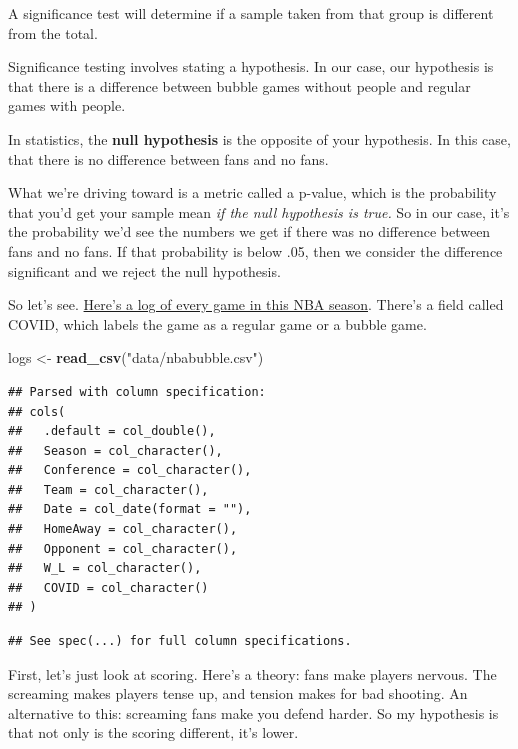 \documentclass[
]{book}
\newenvironment{Shaded}{\begin{snugshade}}{\end{snugshade}}
\newcommand{\KeywordTok}[1]{\textcolor[rgb]{0.13,0.29,0.53}{\textbf{#1}}}
\newcommand{\NormalTok}[1]{#1}
\newcommand{\StringTok}[1]{\textcolor[rgb]{0.31,0.60,0.02}{#1}}
\begin{document}
A significance test will determine if a sample taken from that group is different from the total.

Significance testing involves stating a hypothesis. In our case, our hypothesis is that there is a difference between bubble games without people and regular games with people.

In statistics, the \textbf{null hypothesis} is the opposite of your hypothesis. In this case, that there is no difference between fans and no fans.

What we're driving toward is a metric called a p-value, which is the probability that you'd get your sample mean \emph{if the null hypothesis is true.} So in our case, it's the probability we'd see the numbers we get if there was no difference between fans and no fans. If that probability is below .05, then we consider the difference significant and we reject the null hypothesis.

So let's see. \href{https://unl.box.com/s/ifhuz3t0b7rbk0u8hr52b17klvqv8lxo}{Here's a log of every game in this NBA season}. There's a field called COVID, which labels the game as a regular game or a bubble game.

\begin{Shaded}
\begin{Highlighting}[]
\NormalTok{logs <-}\StringTok{ }\KeywordTok{read_csv}\NormalTok{(}\StringTok{"data/nbabubble.csv"}\NormalTok{)}
\end{Highlighting}
\end{Shaded}

\begin{verbatim}
## Parsed with column specification:
## cols(
##   .default = col_double(),
##   Season = col_character(),
##   Conference = col_character(),
##   Team = col_character(),
##   Date = col_date(format = ""),
##   HomeAway = col_character(),
##   Opponent = col_character(),
##   W_L = col_character(),
##   COVID = col_character()
## )
\end{verbatim}

\begin{verbatim}
## See spec(...) for full column specifications.
\end{verbatim}

First, let's just look at scoring. Here's a theory: fans make players nervous. The screaming makes players tense up, and tension makes for bad shooting. An alternative to this: screaming fans make you defend harder. So my hypothesis is that not only is the scoring different, it's lower.
\end{document}
